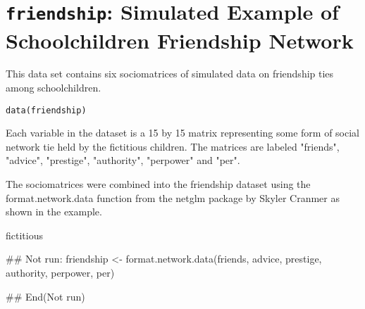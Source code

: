  \section{{\tt friendship}: Simulated Example of Schoolchildren Friendship Network}\label{ss:friendship}
\begin{Description}\relax
This data set contains six sociomatrices of simulated data on friendship ties among schoolchildren.
\end{Description}
\begin{Usage}
\begin{verbatim}data(friendship)\end{verbatim}
\end{Usage}
\begin{Format}\relax
Each variable in the dataset is a 15 by 15 matrix representing some form of social network tie held by the fictitious children. The matrices are labeled "friends", "advice", "prestige", "authority", "perpower" and "per".

The sociomatrices were combined into the friendship dataset using the format.network.data function from the netglm package by Skyler Cranmer as shown in the example.
\end{Format}
\begin{Source}\relax
fictitious
\end{Source}
\begin{Examples}
\begin{ExampleCode}
        ## Not run: 
                friendship <- format.network.data(friends, advice, prestige, authority, perpower, per)  
                        
## End(Not run)\end{ExampleCode}
\end{Examples}


